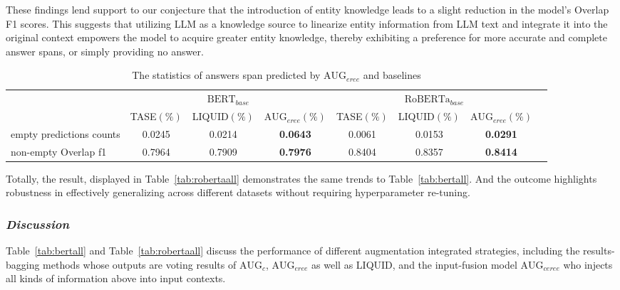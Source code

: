 These findings lend support to our conjecture that the introduction of entity knowledge leads to a slight reduction in the model's Overlap F1 scores. This suggests that utilizing LLM as a knowledge source to linearize entity information from LLM text and integrate it into the original context empowers the model to acquire greater entity knowledge, thereby exhibiting a preference for more accurate and complete answer spans, or simply providing no answer.



\begin{table*}[width=\textwidth,cols=9,pos=h]  %
	\caption{The statistics of answers span predicted by $\text{AUG}_{eree}$ and baselines} 
	\label{tab:answer_counts}
	\begin{tabular*}{\textwidth}{@{\extracolsep{\fill}}lccccccc}
		\toprule
		\multirow{2}{*}{\textbf{ }} & \multicolumn{3}{c}{$\text{BERT}_{base}$} & \multicolumn{3}{c}{$\text{RoBERTa}_{base}$}  \\
		\cline{2-7} 
		\addlinespace
		& TASE\((\%)\) & LIQUID\((\%)\) & $\text{AUG}_{eree}$\((\%)\) & TASE\((\%)\) & LIQUID\((\%)\) & $\text{AUG}_{eree}$\((\%)\) \\
		\midrule
		empty predictions counts   & 0.0245 & 0.0214 & \textbf{0.0643} & 0.0061 & 0.0153 & \textbf{0.0291} \\ 
		non-empty Overlap f1  & 0.7964 & 0.7909 & \textbf{0.7976} & 0.8404 & 0.8357 & \textbf{0.8414} \\
		\bottomrule
	\end{tabular*}
\end{table*}



Totally, the result, displayed in Table~\ref{tab:robertaall} demonstrates the same trends to Table~\ref{tab:bertall}. And the outcome highlights robustness in effectively generalizing across different datasets without requiring hyperparameter re-tuning. 

\subsubsection{\textit{Discussion}}
Table~\ref{tab:bertall} and Table~\ref{tab:robertaall} discuss the performance of different augmentation integrated strategies, including the results-bagging methods whose outputs are voting results of $\text{AUG}_{c}$, $\text{AUG}_{eree}$ as well as LIQUID, and the input-fusion model $\text{AUG}_{ceree}$ who injects all kinds of information above into input contexts.

